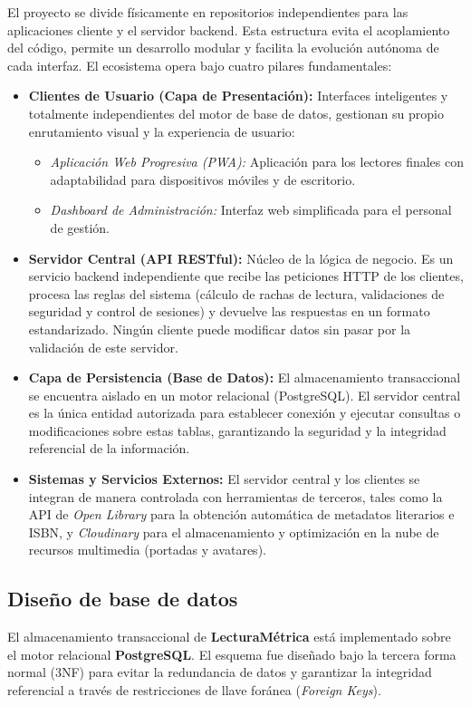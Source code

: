 \documentclass[12pt, atypical, journal]{article}
\begin{document}
El proyecto se divide físicamente en repositorios independientes para las aplicaciones cliente y el servidor backend. Esta estructura evita el acoplamiento del código, permite un desarrollo modular y facilita la evolución autónoma de cada interfaz. El ecosistema opera bajo cuatro pilares fundamentales:

\begin{itemize}
    \item \textbf{Clientes de Usuario (Capa de Presentación):} Interfaces inteligentes y totalmente independientes del motor de base de datos, gestionan su propio enrutamiento visual y la experiencia de usuario:
    \begin{itemize}
        \item \textit{Aplicación Web Progresiva (PWA):} Aplicación para los lectores finales con adaptabilidad para dispositivos móviles y de escritorio.
        \item \textit{Dashboard de Administración:} Interfaz web simplificada para el personal de gestión.
    \end{itemize}
   
    \item \textbf{Servidor Central (API RESTful):} Núcleo de la lógica de negocio. Es un servicio backend independiente que recibe las peticiones HTTP de los clientes, procesa las reglas del sistema (cálculo de rachas de lectura, validaciones de seguridad y control de sesiones) y devuelve las respuestas en un formato estandarizado. Ningún cliente puede modificar datos sin pasar por la validación de este servidor.
   
    \item \textbf{Capa de Persistencia (Base de Datos):} El almacenamiento transaccional se encuentra aislado en un motor relacional (PostgreSQL). El servidor central es la única entidad autorizada para establecer conexión y ejecutar consultas o modificaciones sobre estas tablas, garantizando la seguridad y la integridad referencial de la información.
   
    \item \textbf{Sistemas y Servicios Externos:} El servidor central y los clientes se integran de manera controlada con herramientas de terceros, tales como la API de \textit{Open Library} para la obtención automática de metadatos literarios e ISBN, y \textit{Cloudinary} para el almacenamiento y optimización en la nube de recursos multimedia (portadas y avatares).
\end{itemize}

\subsection{Diseño de base de datos}
El almacenamiento transaccional de \textbf{LecturaMétrica} está implementado sobre el motor relacional \textbf{PostgreSQL}. El esquema fue diseñado bajo la tercera forma normal (3NF) para evitar la redundancia de datos y garantizar la integridad referencial a través de restricciones de llave foránea (\textit{Foreign Keys}).
\end{document}
